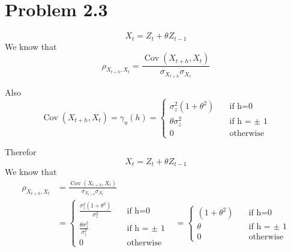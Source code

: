 \documentclass[11pt, oneside]{article}   	%
\newcommand{\Cov}{\operatorname{Cov}}
\begin{document}
\section{Problem 2.3}
\begin{equation}
X_{t} = Z_{t} + \theta Z_{t-1} 
\end{equation}
We know that 
\begin{equation}
\rho_{X_{t+h},X_{t}} = \frac{\Cov(X_{t+h},X_{t})}{\sigma_{X_{t+h}}\sigma_{X_{t}}      } 
\end{equation}

Also 
\begin{equation}
\Cov(X_{t+h},X_{t}) =
 \gamma_{u}(h) = 
     \begin{cases}
       \sigma_{z}^{2}(1+\theta^{2} ) &\quad\text{if h=0}\\
       \theta \sigma_{z}^{2}&\quad\text{if h = $\pm$ 1} \\
       0 &\quad\text{otherwise}
     \end{cases}
\end{equation}

Therefor
\begin{equation}
X_{t} = Z_{t} + \theta Z_{t-1} 
\end{equation}
We know that 
\begin{equation}
\begin{aligned}
\rho_{X_{t+h},X_{t}} &= \frac{\Cov(X_{t+h},X_{t})}{\sigma_{X_{t+h}}\sigma_{X_{t}}}\\
&=   \begin{cases}
       \frac{\sigma_{z}^{2}(1+\theta^{2} )}{\sigma_{z}^{2}} &\quad\text{if h=0}\\
       \frac{\theta \sigma_{z}^{2}}{\sigma_{z}^{2}}&\quad\text{if h = $\pm$ 1} \\
       0 &\quad\text{otherwise}
     \end{cases}
 &=\begin{cases}
       (1+\theta^{2} ) &\quad\text{if h=0}\\
       \theta &\quad\text{if h = $\pm$ 1} \\
       0 &\quad\text{otherwise}
     \end{cases}
\end{aligned}
\end{equation}
\end{document}
